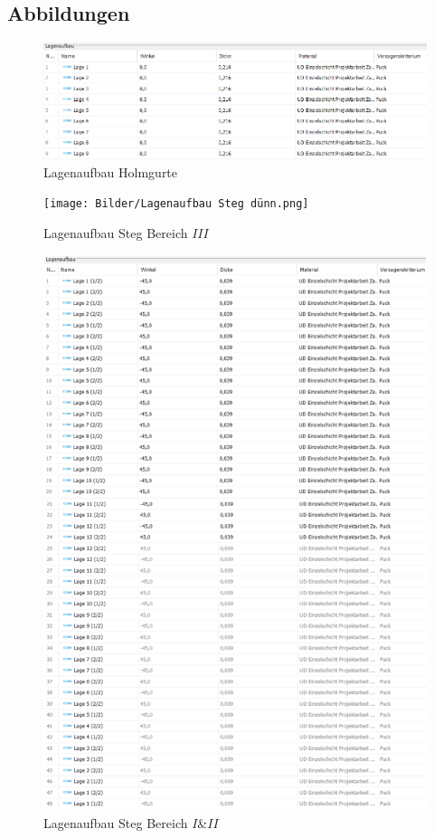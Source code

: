 \subsection{Abbildungen}\label{Abbildungen}
\begin{figure}[h]
	\includegraphics[width=1.0\textwidth]{Bilder/Lagenaufbau Holmgurte.png}
	\caption{Lagenaufbau Holmgurte}
	\label{fig:Lagenaufbau Holmgurte}
\end{figure}
\begin{figure}[h]
	\texttt{[image: Bilder/Lagenaufbau Steg dünn.png]}
	\caption{Lagenaufbau Steg Bereich $III$}
	\label{fig:Lagenaufbau Steg dünn}
\end{figure}
\begin{figure}[h]
	\includegraphics[width=1.0\textwidth]{Bilder/Lagenaufbau Steg dick.png}
	\caption{Lagenaufbau Steg Bereich $I$\&$II$}
	\label{fig:Lagenaufbau Steg dick}
\end{figure}
